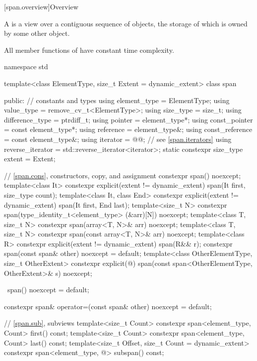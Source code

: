 [span.overview]{Overview}

\pnum
{}%
A  is a view over a contiguous sequence of objects,
the storage of which is owned by some other object.

\pnum
All member functions of  have constant time complexity.

%
\begin{codeblock}
namespace std {
  template<class ElementType, size_t Extent = dynamic_extent>
  class span {
  public:
    // constants and types
    using element_type = ElementType;
    using value_type = remove_cv_t<ElementType>;
    using size_type = size_t;
    using difference_type = ptrdiff_t;
    using pointer = element_type*;
    using const_pointer = const element_type*;
    using reference = element_type&;
    using const_reference = const element_type&;
    using iterator = @@;        // see \ref{span.iterators}
    using reverse_iterator = std::reverse_iterator<iterator>;
    static constexpr size_type extent = Extent;

    // \ref{span.cons}, constructors, copy, and assignment
    constexpr span() noexcept;
    template<class It>
      constexpr explicit(extent != dynamic_extent) span(It first, size_type count);
    template<class It, class End>
      constexpr explicit(extent != dynamic_extent) span(It first, End last);
    template<size_t N>
      constexpr span(type_identity_t<element_type> (&arr)[N]) noexcept;
    template<class T, size_t N>
      constexpr span(array<T, N>& arr) noexcept;
    template<class T, size_t N>
      constexpr span(const array<T, N>& arr) noexcept;
    template<class R>
      constexpr explicit(extent != dynamic_extent) span(R&& r);
    constexpr span(const span& other) noexcept = default;
    template<class OtherElementType, size_t OtherExtent>
      constexpr explicit(@\seebelow@) span(const span<OtherElementType, OtherExtent>& s) noexcept;

    ~span() noexcept = default;

    constexpr span& operator=(const span& other) noexcept = default;

    // \ref{span.sub}, subviews
    template<size_t Count>
      constexpr span<element_type, Count> first() const;
    template<size_t Count>
      constexpr span<element_type, Count> last() const;
    template<size_t Offset, size_t Count = dynamic_extent>
      constexpr span<element_type, @\seebelow@> subspan() const;

}}
\end{codeblock}
